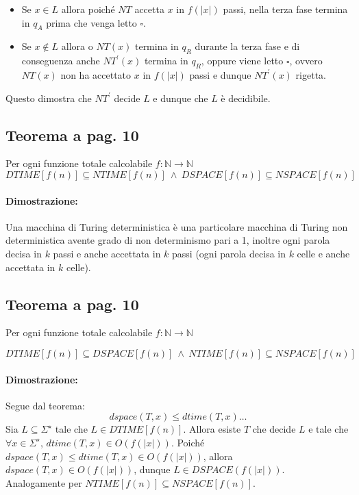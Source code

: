 \begin{itemize}
    \item {
        Se $x\in L$ allora poiché $NT$ accetta $x$ in $f(|x|)$ passi, nella terza fase termina in $q_{A}$ prima che venga
        letto $\square$.
    }
    \item {
        Se $x\notin L$ allora o $NT(x)$ termina in $q_{R}$ durante la terza fase e di conseguenza anche $NT^{'}(x)$ termina in $q_{R}$,
        oppure viene letto $\square$, ovvero $NT(x)$ non ha accettato $x$ in $f(|x|)$ passi e dunque $NT^{'}(x)$ rigetta.
    }
\end{itemize}
Questo dimostra che $NT^{'}$ decide $L$ e dunque che $L$ è decidibile.
\subsection{Teorema a pag. 10}

Per ogni funzione totale calcolabile $f: \mathbb{N} \rightarrow \mathbb{N}$ 
$$DTIME[f(n)] \subseteq NTIME[f(n)]\ \land\ DSPACE[f(n)] \subseteq NSPACE[f(n)]$$ 

\paragraph*{Dimostrazione:} Una macchina di Turing deterministica è una particolare macchina di Turing non deterministica 
avente grado di non determinismo pari a 1, inoltre ogni parola decisa in $k$ passi e anche accettata in $k$ passi 
(ogni parola decisa in $k$ celle e anche accettata in $k$ celle).

\newpage
\subsection{Teorema a pag. 10}

Per ogni funzione totale calcolabile $f: \mathbb{N} \rightarrow \mathbb{N}$ 

$$DTIME[f(n)] \subseteq DSPACE[f(n)]\ \land\ NTIME[f(n)] \subseteq NSPACE[f(n)]$$ 

\paragraph*{Dimostrazione:} Segue dal teorema:
$$dspace(T, x) \leq dtime(T, x)\dots$$
Sia $L \subseteq \Sigma^{\star}$ tale che $L \in DTIME[f(n)]$. Allora esiste $T$ che decide $L$ e tale che 
$\forall x\in \Sigma^{\star}$, $dtime(T, x) \in O(f(|x|))$. Poiché $dspace(T, x) \leq dtime(T, x) \in O(f(|x|))$,
allora $dspace(T, x) \in O(f(|x|))$, dunque $L \in DSPACE(f(|x|))$.\\ Analogamente per $NTIME[f(n)] \subseteq NSPACE[f(n)]$.

